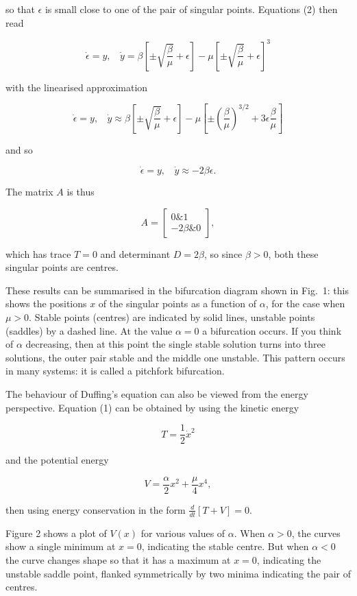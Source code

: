   so that $\epsilon$ is small close to one of the pair of singular points. 
  Equations (2) then read 

  $$\dot{\epsilon}=y \mathrm{,~~~~} \dot{y}=\beta \left[\pm 
  \sqrt{\dfrac{\beta}{\mu}} + \epsilon \right] -\mu \left[\pm 
  \sqrt{\dfrac{\beta}{\mu}} + \epsilon\right]^3 \tag{8}$$ 

  with the linearised approximation 

  $$\dot{\epsilon}=y \mathrm{,~~~~} \dot{y} \approx \beta \left[\pm 
  \sqrt{\dfrac{\beta}{\mu}} + \epsilon \right] -\mu \left[\pm 
  \left(\dfrac{\beta}{\mu}\right)^{3/2} + 3\epsilon\dfrac{\beta}{\mu} \right] 
  \tag{9}$$ 

  and so 

  $$\dot{\epsilon}=y \mathrm{,~~~~} \dot{y} \approx -2 \beta \epsilon . 
  \tag{10}$$ 

  The matrix $A$ is thus 

  $$A=\begin{bmatrix}0 \& 1\\ -2\beta \& 0\end{bmatrix}, \tag{11}$$ 

  which has trace $T=0$ and determinant $D=2\beta$, so since $\beta > 0$, both 
  these singular points are centres. 

  These results can be summarised in the bifurcation diagram shown in Fig.\ 1: 
  this shows the positions $x$ of the singular points as a function of 
  $\alpha$, for the case when $\mu > 0$. Stable points (centres) are indicated 
  by solid lines, unstable points (saddles) by a dashed line. At the value 
  $\alpha=0$ a bifurcation occurs. If you think of $\alpha$ decreasing, then at 
  this point the single stable solution turns into three solutions, the outer 
  pair stable and the middle one unstable. This pattern occurs in many systems: 
  it is called a pitchfork bifurcation. 

  The behaviour of Duffing's equation can also be viewed from the energy 
  perspective. Equation (1) can be obtained by using the kinetic energy 

  $$T=\dfrac{1}{2} \dot{x}^2 \tag{12}$$ 

  and the potential energy 

  $$V=\dfrac{\alpha}{2} x^2 + \dfrac{\mu}{4} x^4, \tag{13}$$ 

  then using energy conservation in the form $\frac{d}{dt}[T+V]=0$. 

  Figure 2 shows a plot of $V(x)$ for various values of $\alpha$. When $\alpha 
  > 0$, the curves show a single minimum at $x=0$, indicating the stable 
  centre. But when $\alpha < 0$ the curve changes shape so that it has a 
  maximum at $x=0$, indicating the unstable saddle point, flanked symmetrically 
  by two minima indicating the pair of centres. 
